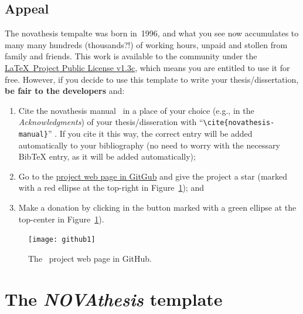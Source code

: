 \subsection{Appeal}
\label{sub:appeal}

The \gls{novathesis} tempalte was born in~1996, and what you see now accumulates to many many hundreds (thousands?!) of working hours, unpaid and stollen from family and friends.  This work is available to the community under the \href{LaTeX project public license}{\LaTeX\ Project Public License v1.3c}, which means you are entitled to use it for free.  However, if you decide to use this template to write your thesis/dissertation, \textbf{be fair to the developers} and:
\begin{enumerate}
  \item Cite the \gls{novathesis} manual~\cite{novathesis-manual} in a place of your choice (e.g., in the \emph{Acknowledgments}) of your thesis/disseration with “\verb!\cite{novathesis-manual}!” .  If you cite it this way, the correct entry will be added automatically to your bibliography (no need to worry with the necessary BibTeX entry, as it will be added automatically);
  \item Go to the
\href{https://github.com/joaomlourenco/novathesis}{project web page in GitGub} and give the project a star (marked with a red ellipse at the top-right in Figure~\ref{fig:github}); and
  \item Make a donation by clicking in the button marked with a green ellipse at the top-center in Figure~\ref{fig:github}).
\end{enumerate}

\begin{figure}[htbp]
  \centering
    \texttt{[image: github1]}
  \caption{The \novathesis\ project web page in GitHub.}
  \label{fig:github}
\end{figure}


\section{The \emph{NOVAthesis} template}
\label{sec:a_bit_of_history}

\newcommand{\mysmallcoversize}{0.09\linewidth}
\renewcommand{\theadfont}{\large\bfseries}
\newtoggle{ntRow}

\newcommand{\ntSchool}[4]{%
    \iftoggle{ntRow}{\rowcolor{GhostWhite}\global\togglefalse{ntRow}}{\global\toggletrue{ntRow}}
    \setlength{\fboxsep}{0pt}%
    \def\myspace{}%
    \makecell*[cc]{%
      \@for\listitem:=#1\do{%
        \myspace\fbox{\colorbox{White}{\texttt{[image: \\listitem]}}}\def\myspace{~}}%
    }
    & #2 \href{#4}{(#3)}\\%
}

